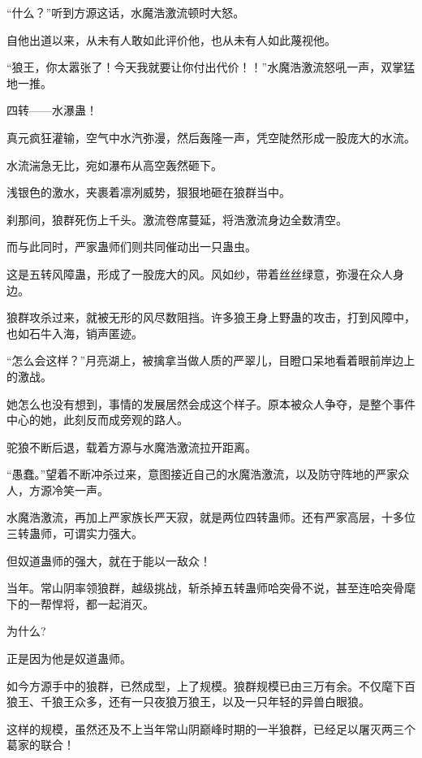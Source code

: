 
\begin{this_body}

“什么？”听到方源这话，水魔浩激流顿时大怒。

自他出道以来，从未有人敢如此评价他，也从未有人如此蔑视他。

“狼王，你太嚣张了！今天我就要让你付出代价！！”水魔浩激流怒吼一声，双掌猛地一推。

四转——水瀑蛊！

真元疯狂灌输，空气中水汽弥漫，然后轰隆一声，凭空陡然形成一股庞大的水流。

水流湍急无比，宛如瀑布从高空轰然砸下。

浅银色的激水，夹裹着凛冽威势，狠狠地砸在狼群当中。

刹那间，狼群死伤上千头。激流卷席蔓延，将浩激流身边全数清空。

而与此同时，严家蛊师们则共同催动出一只蛊虫。

这是五转风障蛊，形成了一股庞大的风。风如纱，带着丝丝绿意，弥漫在众人身边。

狼群攻杀过来，就被无形的风尽数阻挡。许多狼王身上野蛊的攻击，打到风障中，也如石牛入海，销声匿迹。

“怎么会这样？”月亮湖上，被擒拿当做人质的严翠儿，目瞪口呆地看着眼前岸边上的激战。

她怎么也没有想到，事情的发展居然会成这个样子。原本被众人争夺，是整个事件中心的她，此刻反而成旁观的路人。

驼狼不断后退，载着方源与水魔浩激流拉开距离。

“愚蠢。”望着不断冲杀过来，意图接近自己的水魔浩激流，以及防守阵地的严家众人，方源冷笑一声。

水魔浩激流，再加上严家族长严天寂，就是两位四转蛊师。还有严家高层，十多位三转蛊师，可谓实力强大。

但奴道蛊师的强大，就在于能以一敌众！

当年。常山阴率领狼群，越级挑战，斩杀掉五转蛊师哈突骨不说，甚至连哈突骨麾下的一帮悍将，都一起消灭。

为什么?

正是因为他是奴道蛊师。

如今方源手中的狼群，已然成型，上了规模。狼群规模已由三万有余。不仅麾下百狼王、千狼王众多，还有一只夜狼万狼王，以及一只年轻的异兽白眼狼。

这样的规模，虽然还及不上当年常山阴巅峰时期的一半狼群，已经足以屠灭两三个葛家的联合！


\end{this_body}

